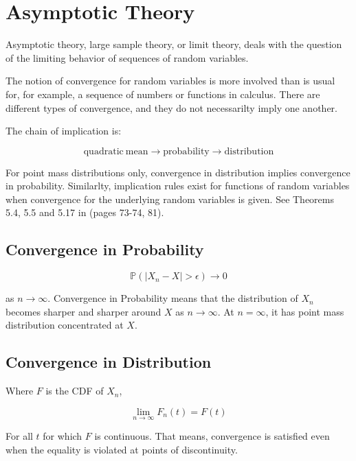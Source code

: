 \section{Asymptotic Theory}

Asymptotic theory, large sample theory, or limit theory, deals with the question of the limiting behavior of sequences of random variables. 

The notion of convergence for random variables is more involved than is usual for, for example, a sequence of numbers or functions in calculus. There are different types of convergence, and they do not necessarilty imply one another.

The chain of implication is:

\begin{equation}
\mathrm{quadratic\ mean} \rightarrow \mathrm{probability} \rightarrow \mathrm{distribution}
\end{equation}

For point mass distributions only, convergence in distribution implies convergence in probability. Similarlty, implication rules exist for functions of random variables when convergence for the underlying random variables is given. See Theorems 5.4, 5.5 and 5.17 in  (pages 73-74, 81). 


\subsection{Convergence in Probability}

\begin{equation}
\mathbb{P}(|X_n - X| > \epsilon) \rightarrow 0
\end{equation}

as $n\rightarrow \infty$. Convergence in Probability means that the distribution of $X_n$ becomes sharper and sharper around $X$ as $n\rightarrow \infty$. At $n=\infty$, it has point mass distribution concentrated at $X$.


\subsection{Convergence in Distribution}
Where $F$ is the CDF of $X_n$,

\begin{equation}
\lim_{n\rightarrow \infty} F_n(t) = F(t)
\end{equation}

For all $t$ for which $F$ is continuous. That means, convergence is satisfied even when the equality is violated at points of discontinuity.


